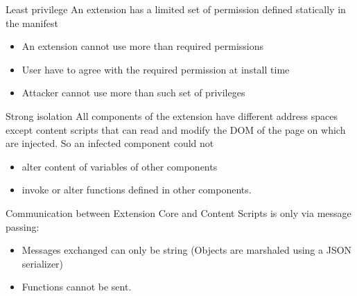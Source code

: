 \documentclass[11pt]{beamer}
\begin{document}
\begin{frame}{Least privilege}
An extension has a limited set of permission defined statically in the manifest
\begin{itemize}
\item An extension cannot use more than required permissions
\item User have to agree with the required permission at install time
\item Attacker cannot use more than such set of privileges
\end{itemize}
\end{frame}

\begin{frame}{Strong isolation}
All components of the extension have different address spaces except content scripts that can read and modify the DOM of the page on which are injected. So an infected component could not
\begin{itemize}
\item alter content of variables of other components
\item invoke or alter functions defined in other components.
\end{itemize}

Communication between Extension Core and Content Scripts is only via message passing:
\begin{itemize}
\item Messages exchanged can only be string (Objects are marshaled using a JSON serializer)
\item Functions cannot be sent.
\end{itemize}
\end{frame}

\end{document}

